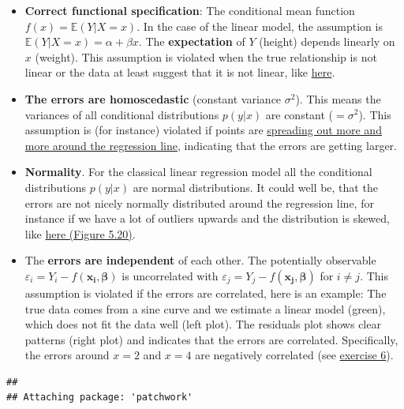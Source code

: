 \documentclass[
]{book}
\begin{document}
\begin{itemize}
\item
  \textbf{Correct functional specification}: The conditional mean function \(f(x) = \mathbb{E}(Y|X=x)\).
  In the case of the linear model, the assumption is \(\mathbb{E}(Y|X=x) = \alpha + \beta x\).
  The \textbf{expectation} of \(Y\) (height) depends linearly on \(x\) (weight).
  This assumption is violated when the true relationship is not linear or the
  data at least suggest that it is not linear, like \href{https://www.alexanderdemos.org/Class5_files/figure-html/unnamed-chunk-2-1.png}{here}.
\item
  \textbf{The errors are homoscedastic} (constant variance \(\sigma^2\)). This means the
  variances of all conditional distributions \(p(y|x)\) are constant (\(=\sigma^2\)).
  This assumption is (for instance) violated if points are \href{https://www.investopedia.com/thmb/n9S9lWMv6X9-sKC2DtAOtUTPSik=/1500x0/filters:no_upscale():max_bytes(150000):strip_icc():format(webp)/Heteroskedasticity22-ce5acc2acef6494d91935588b0599579.png}{spreading out more and more
  around the regression line},
  indicating that the errors are getting larger.
\item
  \textbf{Normality}. For the classical linear regression model all the conditional
  distributions \(p(y|x)\) are normal distributions. It could well be, that
  the errors are not nicely normally distributed around the regression line,
  for instance if we have a lot of outliers upwards and the distribution
  is skewed, like \href{https://www.bookdown.org/rwnahhas/RMPH/mlr-normality.html}{here (Figure 5.20)}.
\item
  The \textbf{errors are independent} of each other.
  The potentially observable \(\varepsilon_i = Y_i - f(\mathbf{x_i}, \mathbf{\beta})\)
  is uncorrelated with \(\varepsilon_j = Y_j - f(\mathbf{x_j}, \mathbf{\beta})\) for
  \(i \neq j\). This assumption is violated if the errors are correlated,
  here is an example: The true data comes from a sine curve and we estimate a
  linear model (green), which does not fit the data well (left plot).
  The residuals plot shows clear patterns (right plot) and indicates
  that the errors are correlated. Specifically, the errors around \(x=2\) and \(x=4\)
  are negatively correlated (see \hyperref[exercise6_simpl_lin_reg]{exercise 6}).
\end{itemize}

\begin{verbatim}
## 
## Attaching package: 'patchwork'
\end{verbatim}
\end{document}
